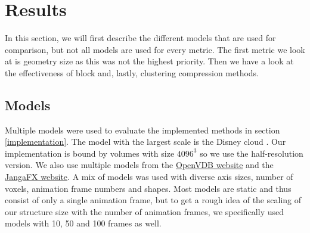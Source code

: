 \section{Results} \label{results}
In this section, we will first describe the different models that are used for comparison, but not all models are used for every metric. The first metric we look at is geometry size as this was not the highest priority. Then we have a look at the effectiveness of block and, lastly, clustering compression methods. 


\subsection{Models} \label{results:models}
Multiple models were used to evaluate the implemented methods in section \ref{implementation}. The model with the largest scale is the Disney cloud \cite{DisneyCloud}. Our implementation is bound by volumes with size $4096^3$ so we use the half-resolution version. We also use multiple models from the \href{https://www.openvdb.org/download/}{OpenVDB website} and the \href{https://jangafx.com/software/embergen/download/free-vdb-animations/}{JangaFX website}. A mix of models was used with diverse axis sizes, number of voxels, animation frame numbers and shapes. Most models are static and thus consist of only a single animation frame, but to get a rough idea of the scaling of our structure size with the number of animation frames, we specifically used models with 10, 50 and 100 frames as well.

